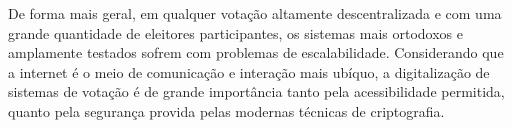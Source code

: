 De forma mais geral, em qualquer votação altamente descentralizada e com uma
grande quantidade de eleitores participantes, os sistemas mais ortodoxos e
amplamente testados sofrem com problemas de escalabilidade. Considerando que a
internet é o meio de comunicação e interação mais ubíquo, a digitalização de
sistemas de votação é de grande importância tanto pela acessibilidade
permitida, quanto pela segurança provida pelas modernas técnicas de
criptografia.
